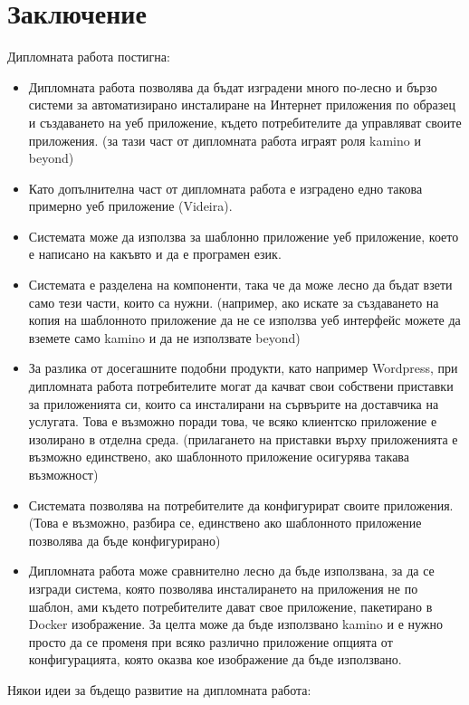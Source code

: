\documentclass[pdftex,14pt,a4paper]{extreport}
\begin{document}
\chapter*{Заключение}
Дипломната работа постигна:
\begin{itemize}
  \item Дипломната работа позволява да бъдат изградени много по-лесно и бързо системи за автоматизирано инсталиране на Интернет приложения по образец и създаването на уеб приложение, където потребителите да управляват своите приложения. (за тази част от дипломната работа играят роля kamino и beyond)
  \item Като допълнителна част от дипломната работа е изградено едно такова примерно уеб приложение (Videira).
  \item Системата може да използва за шаблонно приложение уеб приложение, което е написано на какъвто и да е програмен език.
  \item Системата е разделена на компоненти, така че да може лесно да бъдат взети само тези части, които са нужни. (например, ако искате за създаването на копия на шаблонното приложение да не се използва уеб интерфейс можете да вземете само kamino и да не използвате beyond)
  \item За разлика от досегашните подобни продукти, като например Wordpress, при дипломната работа потребителите могат да качват свои собствени приставки за приложенията си, които са инсталирани на сървърите на доставчика на услугата. Това е възможно поради това, че всяко клиентско приложение е изолирано в отделна среда. (прилагането на приставки върху приложенията е възможно единствено, ако шаблонното приложение осигурява такава възможност)
  \item Системата позволява на потребителите да конфигурират своите приложения. (Това е възможно, разбира се, единствено ако шаблонното приложение позволява да бъде конфигурирано)
  \item Дипломната работа може сравнително лесно да бъде използвана, за да се изгради система, която позволява инсталирането на приложения не по шаблон, ами където потребителите дават свое приложение, пакетирано в Docker изображение. За целта може да бъде използвано kamino и е нужно просто да се променя при всяко различно приложение опцията от конфигурацията, която оказва кое изображение да бъде използвано.
\end{itemize}
Някои идеи за бъдещо развитие на дипломната работа:
\end{document}
